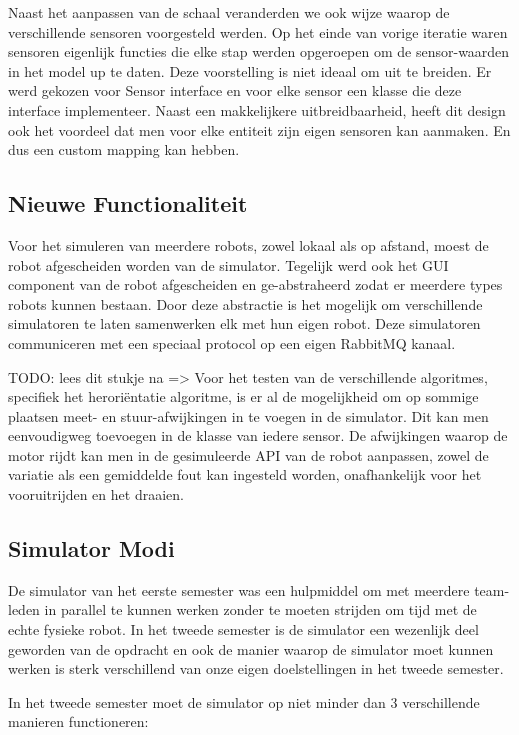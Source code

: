 \documentclass[12pt,a4paper]{report}
\begin{document}
Naast het aanpassen van de schaal veranderden we ook wijze waarop de verschillende sensoren voorgesteld werden. Op het einde van vorige iteratie waren sensoren eigenlijk functies die elke stap werden opgeroepen om de sensor-waarden in het model up te daten. Deze voorstelling is niet ideaal om uit te breiden. Er werd gekozen voor Sensor interface en voor elke sensor een klasse die deze interface implementeer. Naast een makkelijkere uitbreidbaarheid, heeft dit design ook het voordeel dat men voor elke entiteit zijn eigen sensoren kan aanmaken. En dus een custom mapping kan hebben.

\subsection{Nieuwe Functionaliteit}

Voor het simuleren van meerdere robots, zowel lokaal als op afstand, moest de robot afgescheiden worden van de simulator. Tegelijk werd ook het GUI component van de robot afgescheiden en ge-abstraheerd zodat er meerdere types robots kunnen bestaan. Door deze abstractie is het mogelijk om verschillende simulatoren te laten samenwerken elk met hun eigen robot. Deze simulatoren communiceren met een speciaal protocol op een eigen RabbitMQ kanaal.

TODO: lees dit stukje na =>
Voor het testen van de verschillende algoritmes, specifiek het herori\"entatie algoritme, is er al de mogelijkheid om op sommige plaatsen meet- en stuur-afwijkingen in te voegen in de simulator. Dit kan men eenvoudigweg toevoegen in de klasse van iedere sensor. De afwijkingen waarop de motor rijdt kan men in de gesimuleerde API van de robot aanpassen, zowel de variatie als een gemiddelde fout kan ingesteld worden, onafhankelijk voor het vooruitrijden en het draaien.

\subsection{Simulator Modi}

De simulator van het eerste semester was een hulpmiddel om met meerdere team-leden in parallel te kunnen werken zonder te moeten strijden om tijd met de echte fysieke robot. In het tweede semester is de simulator een wezenlijk deel geworden van de opdracht en ook de manier waarop de simulator moet kunnen werken is sterk verschillend van onze eigen doelstellingen in het tweede semester.

In het tweede semester moet de simulator op niet minder dan 3 verschillende manieren functioneren:
\end{document}
